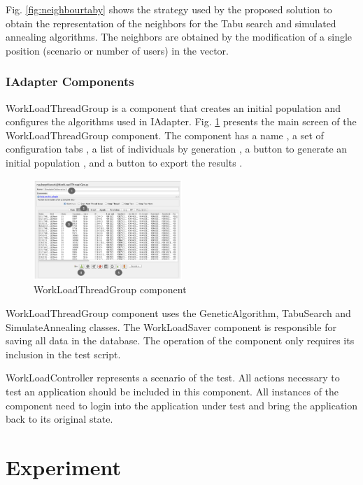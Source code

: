 Fig. \ref{fig:neighbourtaby} shows the strategy used by the proposed solution to obtain the representation of the neighbors for the Tabu search and simulated annealing algorithms. The neighbors are obtained by the modification of a single position (scenario or number of users) in the vector.

\subsubsection{IAdapter Components}
 
WorkLoadThreadGroup is a component that creates an initial population and configures the algorithms used in IAdapter. Fig. \ref{fig:tela1iadapter} presents the main screen of the WorkLoadThreadGroup component. The component has a name , a set of configuration tabs , a list of individuals by generation , a button to generate an initial population , and a button to export the results .

\begin{figure}[h]
\centering
\includegraphics[width=0.5\textwidth]{./images/tela1iadapter.png}
\caption{WorkLoadThreadGroup component}
\label{fig:tela1iadapter}
\end{figure}

WorkLoadThreadGroup component uses the GeneticAlgorithm, TabuSearch and SimulateAnnealing classes.  The WorkLoadSaver component is responsible for saving all data in the database. The operation of the component only requires its inclusion in the test script.

WorkLoadController represents a scenario of the test. All actions necessary to test an application should be included in this component. All instances of the component need to login into the application under test and bring the application back to its original state.

\section{Experiment}

